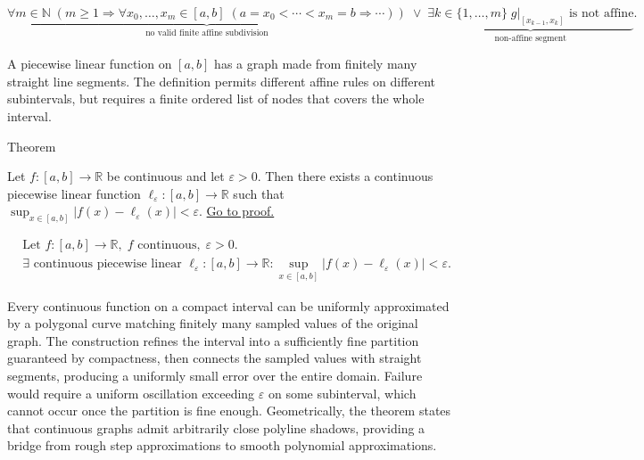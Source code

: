 \begin{remark*}
\[
\underbrace{\forall m\in\mathbb{N}\;(m\ge 1\Rightarrow
\forall x_0,\ldots,x_m\in[a,b]\;(a=x_0<\cdots<x_m=b\Rightarrow\cdots))}_{\text{no valid finite affine subdivision}}
\;\lor\;
\underbrace{\exists k\in\{1,\ldots,m\}\; g|_{[x_{k-1},x_k]}\text{ is not affine}}_{\text{non-affine segment}}.
\]
\end{remark*}

\begin{remark*}[Interpretation]
A piecewise linear function on $[a,b]$ has a graph made from finitely
many straight line segments. The definition permits different affine
rules on different subintervals, but requires a finite ordered list of
nodes that covers the whole interval.
\end{remark*}

\NoLocalDependencies

\begin{theorembox}{Theorem}
\begin{theorem}
\label{thm:piecewise-linear-approximation}
Let $f\colon[a,b]\to\mathbb{R}$ be continuous and let $\varepsilon>0$. Then there exists a continuous piecewise linear function $\ell_\varepsilon\colon[a,b]\to\mathbb{R}$ such that $\sup_{x\in[a,b]}|f(x)-\ell_\varepsilon(x)|<\varepsilon$. \hyperref[prf:piecewise-linear-approximation]{Go to proof.}
\end{theorem}
\end{theorembox}

\begin{remark*}
\[
\begin{aligned}
&\text{Let } f\colon[a,b]\to\mathbb{R},\; f \text{ continuous},\; \varepsilon>0.\\
&\exists\text{ continuous piecewise linear }\ell_\varepsilon\colon[a,b]\to\mathbb{R}:
\sup_{x\in[a,b]}|f(x)-\ell_\varepsilon(x)|<\varepsilon.
\end{aligned}
\]
\end{remark*}

\begin{remark*}[Interpretation]
Every continuous function on a compact interval can be uniformly approximated by a polygonal curve matching finitely many sampled values of the original graph. The construction refines the interval into a sufficiently fine partition guaranteed by compactness, then connects the sampled values with straight segments, producing a uniformly small error over the entire domain. Failure would require a uniform oscillation exceeding $\varepsilon$ on some subinterval, which cannot occur once the partition is fine enough. Geometrically, the theorem states that continuous graphs admit arbitrarily close polyline shadows, providing a bridge from rough step approximations to smooth polynomial approximations.
\end{remark*}

